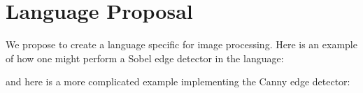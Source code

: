 \section{Language Proposal}


We propose to create a language specific for image processing.
Here is an example of how one might perform a Sobel edge detector
in the \sys{} language:

and here is a more complicated example implementing the Canny edge detector:
%